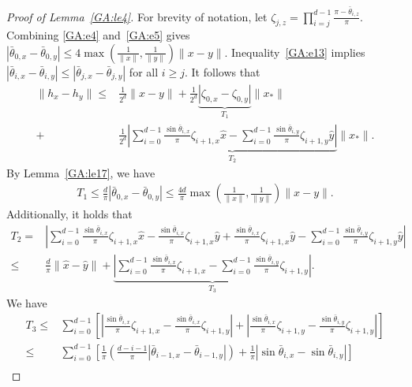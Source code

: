 \begin{proof}[Proof of Lemma~\ref{GA:le4}]
For brevity of notation, let $\zeta_{j, z} = \prod_{i = j}^{d - 1} \frac{\pi - \bar{\theta}_{i, z}}{\pi}$.
Combining \eqref{GA:e4} and~\eqref{GA:e5} gives $|\bar{\theta}_{0, x} - \bar{\theta}_{0, y}| \leq 4 \max\left( \frac{1}{\|x\|}, \frac{1}{\|y\|} \right) \|x - y\|$.
Inequality~\eqref{GA:e13} implies 
$|\bar{\theta}_{i, x} - \bar{\theta}_{i, y}| \leq |\bar{\theta}_{j, x} - \bar{\theta}_{j, y}|$ for all $i \geq j$.
It follows that
\begin{align}
\|h_{x} - h_{y}\| \leq& \frac{1}{2^d}\|x - y\| + \frac{1}{2^d} \underbrace{\left| \zeta_{0, x} - \zeta_{0, y} \right|}_{T_1} \|x_*\| \nonumber \\
+& \frac{1}{2^d} \underbrace{ \left| \sum_{i = 0}^{d - 1} \frac{\sin \bar{\theta}_{i, x}}{\pi} \zeta_{i + 1, x} \hat{x} - \sum_{i = 0}^{d - 1} \frac{\sin \bar{\theta}_{i, y}}{\pi} \zeta_{i + 1, y} \hat{y} \right| }_{T_2} \|x_*\|. \label{GA:e50}
\end{align}
By Lemma~\ref{GA:le17}, we have
\begin{align} \label{GA:e53}
T_1 \leq \frac{d}{\pi} |\bar{\theta}_{0, x} - \bar{\theta}_{0, y}| \leq \frac{4 d}{\pi}\max\left( \frac{1}{\|x\|}, \frac{1}{\|y\|} \right) \|x - y\|.
\end{align}
Additionally, it holds that
\begin{align}
T_2 =& \left| \sum_{i = 0}^{d - 1} \frac{\sin \bar{\theta}_{i, x}}{\pi} \zeta_{i + 1, x} \hat{x} - \frac{\sin \bar{\theta}_{i, x}}{\pi} \zeta_{i + 1, x} \hat{y} + \frac{\sin \bar{\theta}_{i, x}}{\pi} \zeta_{i + 1, x} \hat{y} - \sum_{i = 0}^{d - 1} \frac{\sin \bar{\theta}_{i, y}}{\pi} \zeta_{i + 1, y} \hat{y} \right| \nonumber \\
\leq& \frac{d}{\pi} \|\hat{x} - \hat{y}\| + \underbrace{ \left| \sum_{i = 0}^{d - 1} \frac{\sin \bar{\theta}_{i, x}}{\pi} \zeta_{i + 1, x} - \sum_{i = 0}^{d - 1} \frac{\sin \bar{\theta}_{i, y}}{\pi} \zeta_{i + 1, y} \right|}_{T_3} . \label{GA:e51}
\end{align}
We have
\begin{align}
T_3 \leq& \sum_{i = 0}^{d - 1} \left[ \left| \frac{\sin \bar{\theta}_{i, x}}{\pi} \zeta_{i + 1, x} -\frac{\sin \bar{\theta}_{i, x}}{\pi} \zeta_{i + 1, y} \right|\right. + \left.\left| \frac{\sin \bar{\theta}_{i, x}}{\pi} \zeta_{i + 1, y} - \frac{\sin \bar{\theta}_{i, y}}{\pi} \zeta_{i + 1, y} \right| \right] \nonumber \\
\leq& \sum_{i = 0}^{d - 1} \left[ \frac{1}{\pi} \left( \frac{d - i  - 1}{\pi} \left|\bar{\theta}_{i-1, x} - \bar{\theta}_{i-1, y}\right| \right) + \frac{1}{\pi} |\sin \bar{\theta}_{i, x} - \sin \bar{\theta}_{i, y}|  \right] \nonumber \\

\end{align}
\end{proof}

